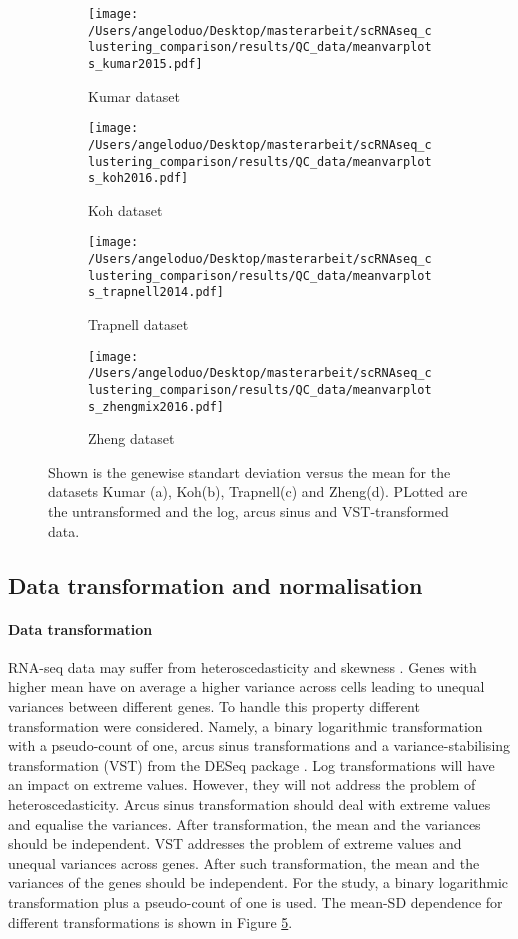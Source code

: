 \documentclass[11pt, a4paper]{article}\usepackage[]{graphicx}\usepackage[]{color}
\begin{document}
\begin{figure}
\centering
\begin{subfigure}{.5\textwidth}
  \centering
  \texttt{[image: /Users/angeloduo/Desktop/masterarbeit/scRNAseq\_clustering\_comparison/results/QC\_data/meanvarplots\_kumar2015.pdf]}
  \caption{Kumar dataset}
  \label{fig:transsim}
\end{subfigure}%
\begin{subfigure}{.5\textwidth}
  \centering
  \texttt{[image: /Users/angeloduo/Desktop/masterarbeit/scRNAseq\_clustering\_comparison/results/QC\_data/meanvarplots\_koh2016.pdf]}
  \caption{Koh dataset}
  \label{fig:transkoh}
\end{subfigure}
\begin{subfigure}{.5\textwidth}
  \centering
  \texttt{[image: /Users/angeloduo/Desktop/masterarbeit/scRNAseq\_clustering\_comparison/results/QC\_data/meanvarplots\_trapnell2014.pdf]}
  \caption{Trapnell dataset}
  \label{fig:transtrapnell}
\end{subfigure}%
\begin{subfigure}{.5\textwidth}
  \centering
  \texttt{[image: /Users/angeloduo/Desktop/masterarbeit/scRNAseq\_clustering\_comparison/results/QC\_data/meanvarplots\_zhengmix2016.pdf]}
  \caption{Zheng dataset}
  \label{fig:transzheng}
\end{subfigure}
\caption{Shown is the genewise standart deviation versus the mean for the datasets Kumar (a), Koh(b), Trapnell(c) and Zheng(d). PLotted are the untransformed and the log, arcus sinus and VST-transformed data.  }
\label{fig:trans}
\end{figure}

\newpage
\subsection{Data transformation and normalisation}
\paragraph{Data transformation}
RNA-seq data may suffer from heteroscedasticity and skewness \citep{zwiener2014transforming}. Genes with higher mean have on average a higher variance across cells leading to unequal variances between different genes. 
To handle this property different transformation were considered. Namely, a binary logarithmic transformation with a pseudo-count of one, arcus sinus transformations and a variance-stabilising transformation (VST) from the DESeq package \citep{huber2002variance}. Log transformations will have an impact on extreme values. However, they will not address the problem of heteroscedasticity. Arcus sinus transformation should deal with extreme values and equalise the variances. After transformation, the mean and the variances should be independent. VST addresses the problem of extreme values and unequal variances across genes. After such transformation, the mean and the variances of the genes should be independent. For the study, a binary logarithmic transformation plus a pseudo-count of one is used.  The mean-SD dependence for different transformations is shown in Figure \ref{fig:trans}.
\end{document}
